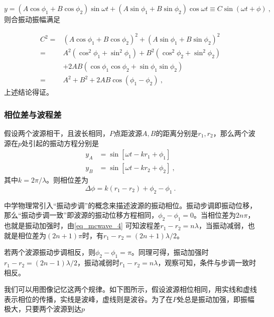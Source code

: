 \begin{equation}
y=\left(A \cos \phi_1+B \cos \phi_2\right) \sin \omega t+\left(A \sin \phi_1+B \sin \phi_2\right) \cos \omega t\equiv C\sin (\omega t+\phi)~,
\end{equation}
则合振动振幅满足

\begin{equation}\label{eq_mcwave_3}
\begin{aligned}
C^2
= & \left(A \cos \phi_1+B \cos \phi_2\right)^2+\left(A \sin \phi_1+B \sin \phi_2\right)^2 \\
= & A^2\left(\cos ^2 \phi_1+\sin ^2 \phi_1\right)+B^2\left(\cos ^2 \phi_2+\sin ^2 \phi_2\right) \\
& +2 A B\left(\cos \phi_1 \cos \phi_2+\sin \phi_1 \sin \phi_2\right) \\
= & A^2+B^2+2 A B \cos \left(\phi_1-\phi_2\right)~,
\end{aligned}
\end{equation}
上述结论得证。
\subsubsection{相位差与波程差}
假设两个波源相干，且波长相同，$P$点距波源$A,B$的距离分别是$r_1,r_2$，那么两个波源在$p$处引起的振动方程分别是
\begin{equation}
\begin{aligned}
y_A&=\sin[\omega t-kr_1+\phi_1]\\
y_B&=\sin[\omega t-kr_2+\phi_2]~,
\end{aligned}
\end{equation}
其中$k=2\pi/\lambda$。则相位差为
\begin{equation}\label{eq_mcwave_4}
\Delta\phi=k(r_1-r_2)+\phi_2-\phi_1~.
\end{equation}

中学物理常引入“振动步调”的概念来描述波源的振动相位。振动步调即振动位移，那么“振动步调一致”即波源的振动位移方程相同，$\phi_2-\phi_1=0$。当相位差为$2n\pi$，也就是振动加强时，由\autoref{eq_mcwave_4} 可知波程差$r_1-r_2=n\lambda$，当振动减弱，也就是相位差为$(2n+1)\pi$时，有$r_1-r_2=(2n+1)\lambda/2$。


若两个波源振动步调相反，则$\phi_2-\phi_1=\pi$。同理可得，振动加强时$r_1-r_2=(2n-1)\lambda/2$，振动减弱时$r_1-r_2=n\lambda$，观察可知，条件与步调一致时相反。

我们可以用图像记忆这两个规律。如下图所示，假设波源相位相同，用实线和虚线表示相位的传播，实线是波峰，虚线则是波谷。为了在$P$处总是振动加强，即振幅极大，只要两个波源到达$p$
